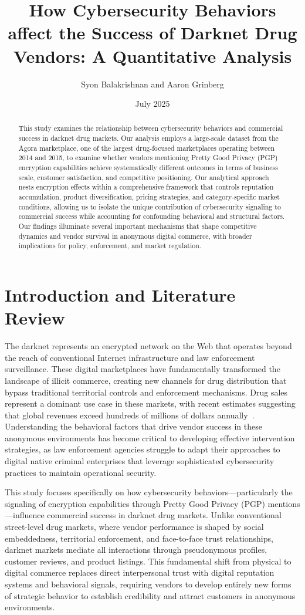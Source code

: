 \documentclass{article}
\title{How Cybersecurity Behaviors affect the Success of Darknet Drug Vendors: A Quantitative Analysis}
\author{\small Syon Balakrishnan and Aaron Grinberg}
\date{\small July 2025}
\begin{document}
\maketitle
\begin{abstract}
This study examines the relationship between cybersecurity behaviors and commercial success in darknet drug markets. Our analysis employs a large-scale dataset from the Agora marketplace, one of the largest drug-focused marketplaces operating between 2014 and 2015, to examine whether vendors mentioning Pretty Good Privacy (PGP) encryption capabilities achieve systematically different outcomes in terms of business scale, customer satisfaction, and competitive positioning. Our analytical approach nests encryption effects within a comprehensive framework that controls reputation accumulation, product diversification, pricing strategies, and category-specific market conditions, allowing us to isolate the unique contribution of cybersecurity signaling to commercial success while accounting for confounding behavioral and structural factors. Our findings illuminate several important mechanisms that shape competitive dynamics and vendor survival in anonymous digital commerce, with broader implications for policy, enforcement, and market regulation.
\end{abstract}
\section{Introduction and Literature Review}

The darknet represents an encrypted network on the Web that operates beyond the reach of conventional Internet infrastructure and law enforcement surveillance. These digital marketplaces have fundamentally transformed the landscape of illicit commerce, creating new channels for drug distribution that bypass traditional territorial controls and enforcement mechanisms. Drug sales represent a dominant use case in these markets, with recent estimates suggesting that global revenues exceed hundreds of millions of dollars annually~\cite{unodc2020}. Understanding the behavioral factors that drive vendor success in these anonymous environments has become critical to developing effective intervention strategies, as law enforcement agencies struggle to adapt their approaches to digital native criminal enterprises that leverage sophisticated cybersecurity practices to maintain operational security.

This study focuses specifically on how cybersecurity behaviors—particularly the signaling of encryption capabilities through Pretty Good Privacy (PGP) mentions—influence commercial success in darknet drug markets. Unlike conventional street-level drug markets, where vendor performance is shaped by social embeddedness, territorial enforcement, and face-to-face trust relationships, darknet markets mediate all interactions through pseudonymous profiles, customer reviews, and product listings. This fundamental shift from physical to digital commerce replaces direct interpersonal trust with digital reputation systems and behavioral signals, requiring vendors to develop entirely new forms of strategic behavior to establish credibility and attract customers in anonymous environments.
\end{document}
